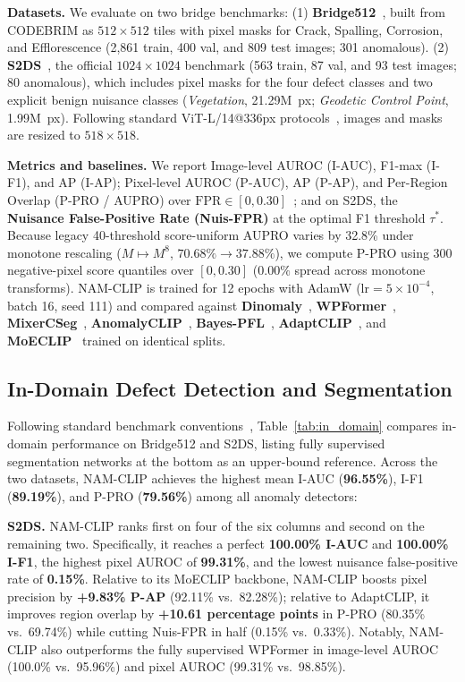 \documentclass[conference]{IEEEtran}
\newcommand{\method}{NAM-CLIP}
\begin{document}
\textbf{Datasets.} We evaluate on two bridge benchmarks: (1) \textbf{Bridge512}~\cite{mundt2019codebrim}, built from CODEBRIM as $512{\times}512$ tiles with pixel masks for Crack, Spalling, Corrosion, and Efflorescence (2,861 train, 400 val, and 809 test images; 301 anomalous). (2) \textbf{S2DS}~\cite{benz2022s2ds}, the official $1024{\times}1024$ benchmark (563 train, 87 val, and 93 test images; 80 anomalous), which includes pixel masks for the four defect classes and two explicit benign nuisance classes (\emph{Vegetation}, 21.29M~px; \emph{Geodetic Control Point}, 1.99M~px). Following standard ViT-L/14@336px protocols~\cite{gao2026adaptclip,park2026moeclip}, images and masks are resized to $518{\times}518$.

\textbf{Metrics and baselines.} We report Image-level AUROC (I-AUC), F1-max (I-F1), and AP (I-AP); Pixel-level AUROC (P-AUC), AP (P-AP), and Per-Region Overlap (P-PRO / AUPRO) over $\mathrm{FPR} \in [0, 0.30]$~\cite{bergmann2021mvtec}; and on S2DS, the \textbf{Nuisance False-Positive Rate (Nuis-FPR)} at the optimal F1 threshold $\tau^*$. Because legacy 40-threshold score-uniform AUPRO varies by 32.8\% under monotone rescaling ($M \mapsto M^8$, $70.68\% \to 37.88\%$), we compute P-PRO using 300 negative-pixel score quantiles over $[0, 0.30]$ ($0.00\%$ spread across monotone transforms). \method{} is trained for 12 epochs with AdamW ($\mathrm{lr}{=}5{\times}10^{-4}$, batch 16, seed 111) and compared against \textbf{Dinomaly}~\cite{guo2025dinomaly}, \textbf{WPFormer}~\cite{yan2025wpformer}, \textbf{MixerCSeg}~\cite{zhao2026mixercseg}, \textbf{AnomalyCLIP}~\cite{zhou2024anomalyclip}, \textbf{Bayes-PFL}~\cite{qu2025bayespfl}, \textbf{AdaptCLIP}~\cite{gao2026adaptclip}, and \textbf{MoECLIP}~\cite{park2026moeclip} trained on identical splits.

\subsection{In-Domain Defect Detection and Segmentation}


Following standard benchmark conventions~\cite{gao2026adaptclip,park2026moeclip}, Table~\ref{tab:in_domain} compares in-domain performance on Bridge512 and S2DS, listing fully supervised segmentation networks at the bottom as an upper-bound reference. Across the two datasets, \method{} achieves the highest mean I-AUC (\textbf{96.55\%}), I-F1 (\textbf{89.19\%}), and P-PRO (\textbf{79.56\%}) among all anomaly detectors:

\textbf{S2DS.} \method{} ranks first on four of the six columns and second on the remaining two. Specifically, it reaches a perfect \textbf{100.00\% I-AUC} and \textbf{100.00\% I-F1}, the highest pixel AUROC of \textbf{99.31\%}, and the lowest nuisance false-positive rate of \textbf{0.15\%}. Relative to its MoECLIP backbone, \method{} boosts pixel precision by \textbf{+9.83\% P-AP} (92.11\% vs.\ 82.28\%); relative to AdaptCLIP, it improves region overlap by \textbf{+10.61 percentage points} in P-PRO (80.35\% vs.\ 69.74\%) while cutting Nuis-FPR in half (0.15\% vs.\ 0.33\%). Notably, \method{} also outperforms the fully supervised WPFormer in image-level AUROC (100.0\% vs.\ 95.96\%) and pixel AUROC (99.31\% vs.\ 98.85\%).
\end{document}
